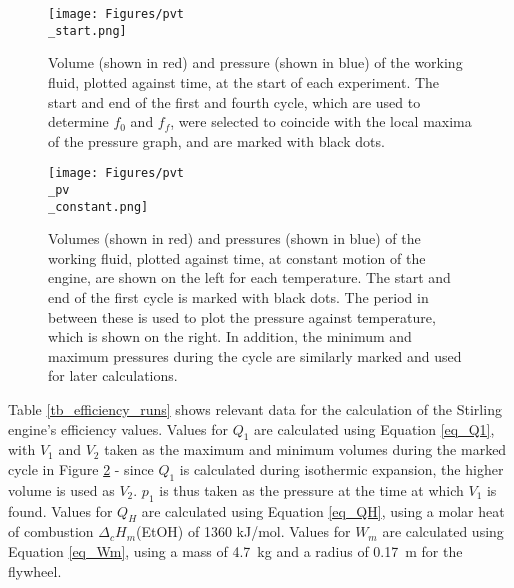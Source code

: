 \documentclass[titlepage]{article}
\begin{document}
\begin{figure}[H]
    \label{fig_start_pvt}
    \centering
    \texttt{[image: Figures/pvt\\\_start.png]}
    \caption{Volume (shown in red) and pressure (shown in blue) of the working fluid, plotted against time, at the start of each experiment. The start and end of the first and fourth cycle, which are used to determine \(f_0\) and \(f_f\), were selected to coincide with the local maxima of the pressure graph, and are marked with black dots.}
\end{figure}

\begin{figure}[H]
    \label{fig_constant_pvt_pv}
    \centering
    \texttt{[image: Figures/pvt\\\_pv\\\_constant.png]}
    \caption{Volumes (shown in red) and pressures (shown in blue) of the working fluid, plotted against time, at constant motion of the engine, are shown on the left for each temperature. The start and end of the first cycle is marked with black dots. The period in between these is used to plot the pressure against temperature, which is shown on the right. In addition, the minimum and maximum pressures during the cycle are similarly marked and used for later calculations.}
\end{figure}

\noindent Table \ref{tb_efficiency_runs} shows relevant data for the calculation of the Stirling engine's efficiency values. Values for \(Q_1\) are calculated using Equation \ref{eq_Q1}, with \(V_1\) and \(V_2\) taken as the maximum and minimum volumes during the marked cycle in Figure \ref{fig_constant_pvt_pv} - since \(Q_1\) is calculated during isothermic expansion, the higher volume is used as \(V_2\). \(p_1\) is thus taken as the pressure at the time at which \(V_1\) is found. Values for \(Q_H\) are calculated using Equation \ref{eq_QH}, using a molar heat of combustion \(\Delta_c H_m\)(EtOH) of 1360 kJ/mol. Values for \(W_m\) are calculated using Equation \ref{eq_Wm}, using a mass of 4.7~kg and a radius of 0.17~m for the flywheel.
\end{document}
